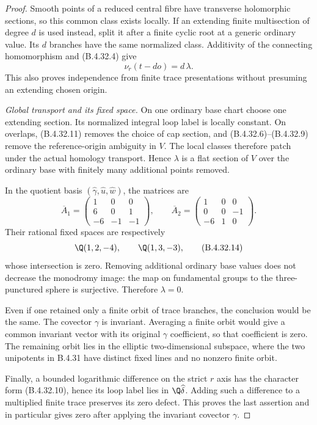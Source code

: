 \begin{proof}
Smooth points of a reduced central fibre have transverse
holomorphic sections, so this common class exists locally.
If an extending finite multisection of degree $d$ is used
instead, split it after a finite cyclic root at a generic
ordinary value. Its $d$ branches have the same normalized
class. Additivity of the connecting homomorphism and
(B.4.32.4) give
\[
            \nu_r(t-do)=d\,\lambda .
 \tag{B.4.32.12}
\]
This also proves independence from finite trace
presentations without presuming an extending chosen origin.

\emph{Global transport and its fixed space.}
On one ordinary base chart choose one extending section.
Its normalized integral loop label is locally constant.
On overlaps, (B.4.32.11) removes the choice of cap section,
and (B.4.32.6)--(B.4.32.9) remove the reference-origin
ambiguity in $V$. The local classes therefore patch under
the actual homology transport. Hence $\lambda$ is a flat
section of $V$ over the ordinary base with finitely many
additional points removed.

In the quotient basis
$(\widehat\gamma,\widehat u,\widehat w)$, the matrices are
\[
 \overline A_1=
 \begin{pmatrix}1&0&0\\6&0&1\\-6&-1&-1\end{pmatrix},
 \qquad
 \overline A_2=
 \begin{pmatrix}1&0&0\\0&0&-1\\-6&1&0\end{pmatrix}.
 \tag{B.4.32.13}
\]
Their rational fixed spaces are respectively
\[
 \Q(1,2,-4),\qquad \Q(1,3,-3),
 \tag{B.4.32.14}
\]
whose intersection is zero. Removing additional ordinary
base values does not decrease the monodromy image: the
map on fundamental groups to the three-punctured sphere
is surjective. Therefore $\lambda=0$.

Even if one retained only a finite orbit of trace branches,
the conclusion would be the same. The covector $\gamma$
is invariant. Averaging a finite orbit would give a common
invariant vector with its original $\gamma$ coefficient,
so that coefficient is zero. The remaining orbit lies in
the elliptic two-dimensional subspace, where the two
unipotents in B.4.31 have distinct fixed lines and no
nonzero finite orbit.

Finally, a bounded logarithmic difference on the strict
$r$ axis has the character form (B.4.32.10), hence its
loop label lies in $\Q\widehat\delta$. Adding such a
difference to a multiplied finite trace preserves its
zero defect. This proves the last assertion and in
particular gives zero after applying the invariant
covector $\gamma$.
\end{proof}


